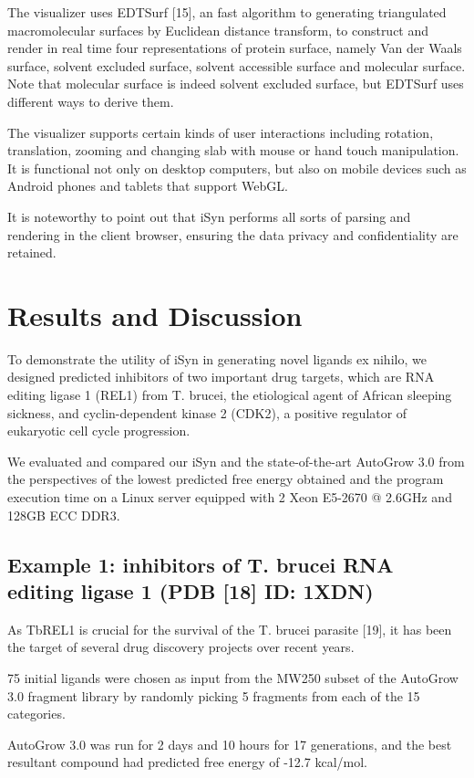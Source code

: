The visualizer uses EDTSurf [15], an fast algorithm to generating triangulated macromolecular surfaces by Euclidean distance transform, to construct and render in real time four representations of protein surface, namely Van der Waals surface, solvent excluded surface, solvent accessible surface and molecular surface. Note that molecular surface is indeed solvent excluded surface, but EDTSurf uses different ways to derive them.

The visualizer supports certain kinds of user interactions including rotation, translation, zooming and changing slab with mouse or hand touch manipulation. It is functional not only on desktop computers, but also on mobile devices such as Android phones and tablets that support WebGL.

It is noteworthy to point out that iSyn performs all sorts of parsing and rendering in the client browser, ensuring the data privacy and confidentiality are retained.

\section{Results and Discussion}

To demonstrate the utility of iSyn in generating novel ligands ex nihilo, we designed predicted inhibitors of two important drug targets, which are RNA editing ligase 1 (REL1) from T. brucei, the etiological agent of African sleeping sickness, and cyclin-dependent kinase 2 (CDK2), a positive regulator of eukaryotic cell cycle progression.

We evaluated and compared our iSyn and the state-of-the-art AutoGrow 3.0 from the perspectives of the lowest predicted free energy obtained and the program execution time on a Linux server equipped with 2 Xeon E5-2670 @ 2.6GHz and 128GB ECC DDR3.

\subsection{Example 1: inhibitors of T. brucei RNA editing ligase 1 (PDB [18] ID: 1XDN)}

As TbREL1 is crucial for the survival of the T. brucei parasite [19], it has been the target of several drug discovery projects over recent years.

75 initial ligands were chosen as input from the MW250 subset of the AutoGrow 3.0 fragment library by randomly picking 5 fragments from each of the 15 categories.

AutoGrow 3.0 was run for 2 days and 10 hours for 17 generations, and the best resultant compound had predicted free energy of -12.7 kcal/mol.

